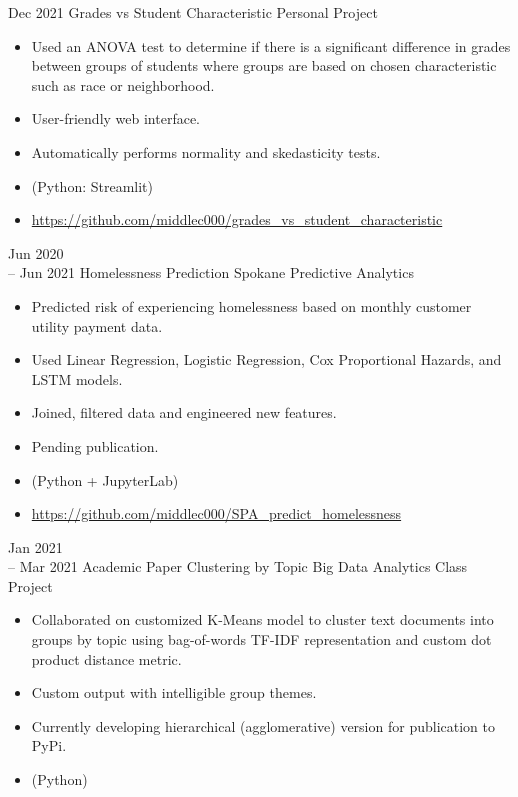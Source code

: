 \documentclass[11pt]{developercv} %
\begin{document}
\begin{entrylist}
	\entry
		{Dec 2021}
		{Grades vs Student Characteristic}
		{Personal Project}
		{\vspace{-0.5cm}\begin{itemize}
			\item Used an ANOVA test to determine if there is a significant difference in grades between groups of students where groups are based on chosen characteristic such as race or neighborhood. 
			\item User-friendly web interface.
			\item Automatically performs normality and skedasticity tests.
			\item (Python: Streamlit)
			\item \url{https://github.com/middlec000/grades_vs_student_characteristic}
		\end{itemize}}
	\entry
	    {Jun 2020 \\
		-- Jun 2021}
	    {Homelessness Prediction}
	    {Spokane Predictive Analytics}
		{\vspace{-0.5cm}\begin{itemize}
			\item Predicted risk of experiencing homelessness based on monthly customer utility payment data.
			\item Used Linear Regression, Logistic Regression, Cox Proportional Hazards, and LSTM models.
			\item Joined, filtered data and engineered new features.
			\item Pending publication.
			\item (Python + JupyterLab)
			\item \url{https://github.com/middlec000/SPA_predict_homelessness}
		\end{itemize}}
	\entry
		{Jan 2021 \\
		-- Mar 2021}
		{Academic Paper Clustering by Topic}
		{Big Data Analytics Class Project}
		{\vspace{-0.5cm}\begin{itemize}
			\item Collaborated on customized K-Means model to cluster text documents into groups by topic using bag-of-words TF-IDF representation and custom dot product distance metric.
			\item Custom output with intelligible group themes.
			\item Currently developing hierarchical (agglomerative) version for publication to PyPi.
			\item (Python)

\end{itemize}}
\end{entrylist}
\end{document}
